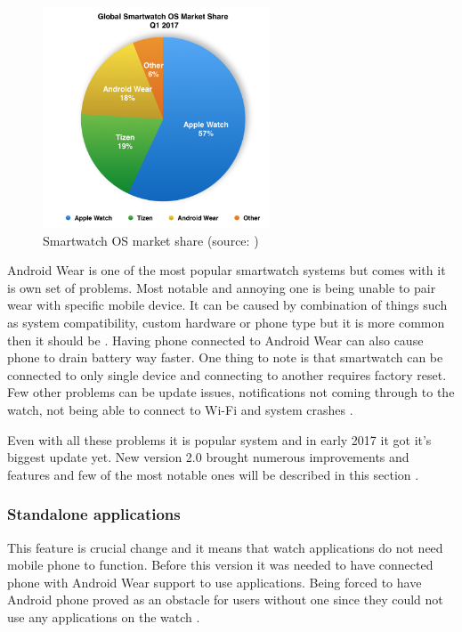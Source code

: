 \begin{figure}[H]
	\begin{centering}
		\includegraphics[width=0.6\textwidth]{img/wear_market_share}
		\par\end{centering}
	\caption{Smartwatch OS market share (source: \cite{TOAW})\label{fig:SmartwatchOSMarketShare}}
	\label{fig02c04}
\end{figure}

Android Wear is one of the most popular smartwatch systems but comes with it is own set of problems. Most notable and annoying one is being unable to pair wear with specific mobile device. It can be caused by combination of things such as system compatibility, custom hardware or phone type but it is more common then it should be \cite{AWPaS}. Having phone connected to Android Wear can also cause phone to drain battery way faster. One thing to note is that smartwatch can be connected to only single device and connecting to another requires factory reset. Few other problems can be update issues, notifications not coming through to the watch, not being able to connect to Wi-Fi and system crashes \cite{WAWP}.

Even with all these problems it is popular system and in early 2017 it got it's biggest update yet. New version 2.0 brought numerous improvements and features and few of the most notable ones will be described in this section \cite{AW2UG, AW2WN, AW2N}.

\subsubsection{Standalone applications}\label{sec:StandaloneApplications}
This feature is crucial change and it means that watch applications do not need mobile phone to function. Before this version it was needed to have connected phone with Android Wear support to use applications. Being forced to have Android phone proved as an obstacle for users without one since they could not use any applications on the watch \cite{AW2UG, AW2WN}.

